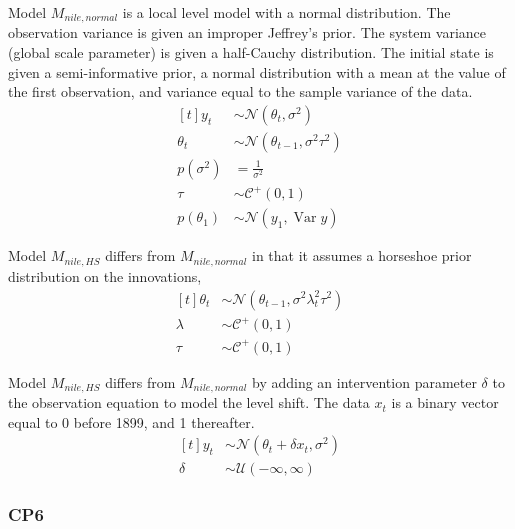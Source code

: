 \documentclass{article}
\newcommand{\paren}[1]{\ensuremath{\left(#1\right)}}
\newcommand{\dnorm}[1]{\ensuremath{\mathcal{N}\paren{#1}}}
\newcommand{\dhalfcauchy}[1]{\ensuremath{\mathcal{C}^{+}\paren{#1}}}
\newcommand{\dunif}[1]{\ensuremath{\mathcal{U}\paren{#1}}}
\DeclareMathOperator{\var}{Var}
\begin{document}
Model $M_{nile,normal}$ is a local level model with a normal distribution.
The observation variance is given an improper Jeffrey's prior.
The system variance (global scale parameter) is given a half-Cauchy distribution. 
The initial state is given a semi-informative prior, a normal distribution with a mean at the value of the first observation, and variance equal to the sample variance of the data.
\begin{equation}
  \label{eq:11}
  \begin{aligned}[t]
    y_{t} &\sim \dnorm{\theta_{t}, \sigma^{2}} \\
    \theta_{t} &\sim \dnorm{\theta_{t - 1}, \sigma^{2} \tau^{2}} \\
    p(\sigma^{2}) &= \frac{1}{\sigma^{2}} \\
    \tau &\sim \dhalfcauchy{0, 1} \\
    p(\theta_{1}) &\sim \dnorm{y_{1}, \var{y}}
  \end{aligned}
\end{equation}

Model $M_{nile,HS}$ differs from $M_{nile,normal}$ in that it assumes a horseshoe prior distribution on 
the innovations,
\begin{equation}
  \label{eq:18}
  \begin{aligned}[t]
    \theta_{t} &\sim \dnorm{\theta_{t - 1}, \sigma^{2} \lambda_{t}^{2} \tau^{2}} \\
    \lambda &\sim \dhalfcauchy{0, 1} \\
    \tau &\sim \dhalfcauchy{0, 1}
  \end{aligned}
\end{equation}

Model $M_{nile,HS}$ differs from $M_{nile,normal}$ by adding an intervention parameter $\delta$ to the observation equation to model the level shift. 
The data $x_{t}$ is a binary vector equal to 0 before 1899, and 1 thereafter.
\begin{equation}
  \label{eq:18}
  \begin{aligned}[t]
    y_{t} &\sim \dnorm{\theta_{t} + \delta x_{t}, \sigma^{2}} \\
    \delta &\sim \dunif{-\infty, \infty}
  \end{aligned}
\end{equation}


\subsubsection{CP6}
\label{sec:cp6}




% 



% 

\printbibliography{}
\end{document}

